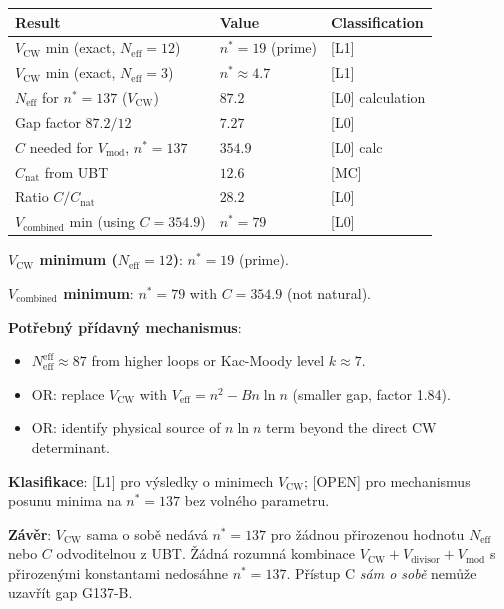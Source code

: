 \documentclass[12pt,a4paper]{article}
\theoremstyle{definition}
\theoremstyle{remark}
\newcommand{\Veff}{V_{\mathrm{eff}}}
\newcommand{\Neff}{N_{\mathrm{eff}}}
\newcommand{\VCW}{V_{\mathrm{CW}}}
\begin{document}
\begin{center}
\begin{tabular}{lll}
  \toprule
  Result & Value & Classification \\
  \midrule
  $\VCW$ min (exact, $\Neff=12$) & $n^* = 19$ (prime) & [L1] \\
  $\VCW$ min (exact, $\Neff=3$)  & $n^* \approx 4.7$  & [L1] \\
  $\Neff$ for $n^*=137$ ($\VCW$) & $87.2$ & [L0] calculation \\
  Gap factor $87.2/12$           & $7.27$ & [L0] \\
  $C$ needed for $V_{\mathrm{mod}}$, $n^*=137$ & $354.9$ & [L0] calc \\
  $C_{\mathrm{nat}}$ from UBT    & $12.6$ & [MC] \\
  Ratio $C/C_{\mathrm{nat}}$     & $28.2$ & [L0] \\
  $V_{\mathrm{combined}}$ min (using $C=354.9$) & $n^*=79$ & [L0] \\
  \bottomrule
\end{tabular}
\end{center}

\begin{statusbox}
\textbf{$V_{\mathrm{CW}}$ minimum ($\Neff=12$)}: $n^* = 19$ (prime).

\textbf{$V_{\mathrm{combined}}$ minimum}: $n^* = 79$ with $C = 354.9$ (not natural).

\textbf{Potřebný přídavný mechanismus}:
\begin{itemize}
  \item $\Neff^{\mathrm{eff}} \approx 87$ from higher loops or Kac-Moody level $k\approx 7$.
  \item OR: replace $\VCW$ with $\Veff = n^2 - Bn\ln n$ (smaller gap, factor 1.84).
  \item OR: identify physical source of $n\ln n$ term beyond the direct CW determinant.
\end{itemize}

\textbf{Klasifikace}: [L1] pro výsledky o minimech $\VCW$;
[OPEN] pro mechanismus posunu minima na $n^*=137$ bez volného parametru.

\textbf{Závěr}: $\VCW$ sama o sobě nedává $n^*=137$ pro žádnou přirozenou hodnotu
$\Neff$ nebo $C$ odvoditelnou z UBT.  Žádná rozumná kombinace $\VCW +
V_{\mathrm{divisor}} + V_{\mathrm{mod}}$ s přirozenými konstantami nedosáhne
$n^*=137$.  Přístup C \emph{sám o sobě} nemůže uzavřít gap G137-B.
\end{statusbox}

\ifdefined\INCLUDEMODE
\else
  
\end{document}

